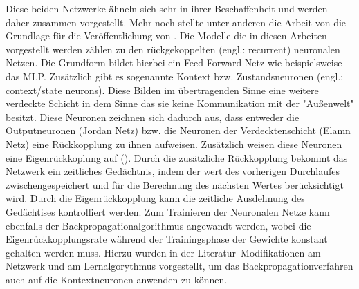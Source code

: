 Diese beiden Netzwerke ähneln sich sehr in ihrer Beschaffenheit und werden daher zusammen vorgestellt. Mehr noch stellte unter anderen die Arbeit von \citet{Jordan1986} die Grundlage für die Veröffentlichung von \citet{Elman1990}. Die Modelle die in diesen Arbeiten vorgestellt werden zählen zu den rückgekoppelten (engl.: recurrent) neuronalen Netzen. Die Grundform bildet hierbei ein Feed-Forward Netz wie beispielsweise das MLP. Zusätzlich gibt es sogenannte Kontext bzw. Zustandsneuronen (engl.: context/state neurons). Diese Bilden im übertragenden Sinne eine weitere verdeckte Schicht in dem Sinne das sie keine Kommunikation mit der "Außenwelt" besitzt. Diese Neuronen zeichnen sich dadurch aus, dass entweder die Outputneuronen (Jordan Netz) bzw. die Neuronen der Verdecktenschicht (Elamn Netz) eine Rückkopplung zu ihnen aufweisen. Zusätzlich weisen diese Neuronen eine Eigenrückkoplung auf (). 
Durch die zusätzliche Rückkopplung bekommt das Netzwerk ein zeitliches Gedächtnis, indem der wert des vorherigen Durchlaufes zwischengespeichert und für die Berechnung des nächsten Wertes berücksichtigt wird. Durch die Eigenrückkopplung kann die zeitliche Ausdehnung des Gedächtises kontrolliert werden. Zum Trainieren der Neuronalen Netze kann ebenfalls der Backpropagationalgorithmus angewandt werden, wobei die Eigenrückkopplungsrate während der Trainingsphase der Gewichte konstant gehalten werden muss. Hierzu wurden in der Literatur\, Modifikationen am Netzwerk und am Lernalgorythmus vorgestellt, um das Backpropagationverfahren auch auf die Kontextneuronen anwenden zu können.


